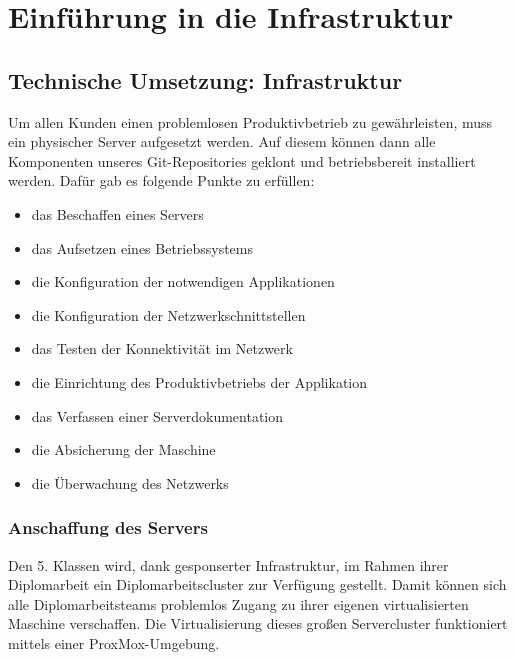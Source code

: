 \documentclass[
]{article}
\date{}
\providecommand{\tightlist}{%
  \setlength{\itemsep}{0pt}\setlength{\parskip}{0pt}}
\begin{document}
\chapter{Einführung in die Infrastruktur}
\label{intro_infra}
\renewcommand{\kapitelautor}{Autor: Hannes Weiss}

\hypertarget{technische-umsetzung-infrastruktur}{%
\section{Technische Umsetzung:
Infrastruktur}\label{technische-umsetzung-infrastruktur}}

Um allen Kunden einen problemlosen Produktivbetrieb zu gewährleisten,
muss ein physischer Server aufgesetzt werden. Auf diesem können dann
alle Komponenten unseres Git-Repositories geklont und betriebsbereit
installiert werden. Dafür gab es folgende Punkte zu erfüllen:

\begin{itemize}
\tightlist
\item
  das Beschaffen eines Servers
\item
  das Aufsetzen eines Betriebssystems
\item
  die Konfiguration der notwendigen Applikationen
\item
  die Konfiguration der Netzwerkschnittstellen
\item
  das Testen der Konnektivität im Netzwerk
\item
  die Einrichtung des Produktivbetriebs der Applikation
\item
  das Verfassen einer Serverdokumentation
\item
  die Absicherung der Maschine
\item
  die Überwachung des Netzwerks
\end{itemize}

\hypertarget{anschaffung-des-servers}{%
\subsection{Anschaffung des Servers}\label{anschaffung-des-servers}}

Den 5. Klassen wird, dank gesponserter Infrastruktur, im Rahmen ihrer
Diplomarbeit ein Diplomarbeitscluster zur Verfügung gestellt. Damit
können sich alle Diplomarbeitsteams problemlos Zugang zu ihrer eigenen
virtualisierten Maschine verschaffen. Die Virtualisierung dieses großen
Servercluster funktioniert mittels einer ProxMox-Umgebung.
\end{document}
